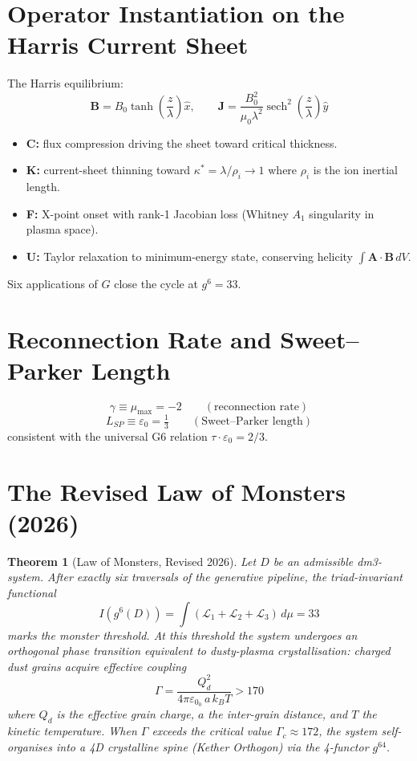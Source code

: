 \documentclass[11pt, twoside, openright]{book}
\theoremstyle{plain}
\newtheorem{theorem}{Theorem}[chapter]
\theoremstyle{definition}
\newcommand{\eps}{\varepsilon_0}
\begin{document}
\section{Operator Instantiation on the Harris Current Sheet}

The Harris equilibrium:
\[
\mathbf{B} = B_0 \tanh\!\left(\frac{z}{\lambda}\right)\hat{x},
\qquad
\mathbf{J} = \frac{B_0^2}{\mu_0 \lambda^2}
\operatorname{sech}^2\!\left(\frac{z}{\lambda}\right)\hat{y}
\]

\begin{itemize}[leftmargin=*]
  \item \textbf{C:} flux compression driving the sheet toward critical
    thickness.
  \item \textbf{K:} current-sheet thinning toward $\kappa^* = \lambda/\rho_i \to 1$
    where $\rho_i$ is the ion inertial length.
  \item \textbf{F:} X-point onset with rank-1 Jacobian loss (Whitney $A_1$
    singularity in plasma space).
  \item \textbf{U:} Taylor relaxation to minimum-energy state, conserving
    helicity $\int \mathbf{A} \cdot \mathbf{B}\,dV$.
\end{itemize}

Six applications of $G$ close the cycle at $g^6 = 33$.

\section{Reconnection Rate and Sweet--Parker Length}

\[
\gamma \equiv \mu_{\max} = -2 \qquad (\text{reconnection rate})
\]
\[
L_{SP} \equiv \eps = \tfrac{1}{3} \qquad (\text{Sweet--Parker length})
\]
consistent with the universal G6 relation $\tau \cdot \eps = 2/3$.

\section{The Revised Law of Monsters (2026)}

\begin{theorem}[Law of Monsters, Revised 2026]
Let $D$ be an admissible dm3-system. After exactly six traversals of
the generative pipeline, the triad-invariant functional
\[
I(g^6(D)) = \int (\mathcal{L}_1 + \mathcal{L}_2 + \mathcal{L}_3)\,d\mu = 33
\]
marks the monster threshold. At this threshold the system undergoes
an orthogonal phase transition equivalent to dusty-plasma
crystallisation: charged dust grains acquire effective coupling
\[
\Gamma = \frac{Q_d^2}{4\pi\eps_0\, a\, k_B T} > 170
\]
where $Q_d$ is the effective grain charge, $a$ the inter-grain distance,
and $T$ the kinetic temperature. When $\Gamma$ exceeds the critical
value $\Gamma_c \approx 172$, the system self-organises into a 4D
crystalline spine (Kether Orthogon) via the 4-functor $g^{64}$.
\end{theorem}
\end{document}
